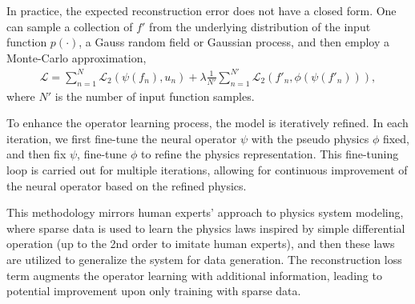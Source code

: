 In practice, the expected reconstruction error does not have a closed form. One can sample a collection of $f'$ from the underlying distribution of the input function $p(\cdot)$, \eg a Gauss random field or Gaussian process, and then employ a Monte-Carlo approximation, 
\begin{align}
	\mathcal{L}=  \sum_{n=1}^{N} \mathcal{L}_2(\psi(f_n),u_n) + \lambda  \frac{1}{N'} \sum_{n=1}^{N'} \mathcal{L}_2(f'_n, \phi(\psi(f'_n))), \label{eq:fine-tune-loss}
\end{align}
where \(N'\) is the number of input function samples. %




To enhance the operator learning process, the model is iteratively refined. In each iteration, we first fine-tune the neural operator $\psi$ with the pseudo physics $\phi$ fixed, and then fix $\psi$,  fine-tune  $\phi$ to refine the physics representation. This fine-tuning loop is carried out for multiple iterations, allowing for continuous improvement of the neural operator based on the refined physics.


This methodology mirrors  human experts' approach to physics system modeling, where sparse data is used to learn the physics laws inspired by simple differential operation (up to the 2nd order to imitate human experts), and then these laws are utilized to generalize the system for data generation. The  reconstruction loss term augments the operator learning with additional information, leading to potential improvement upon only training with sparse data. 

